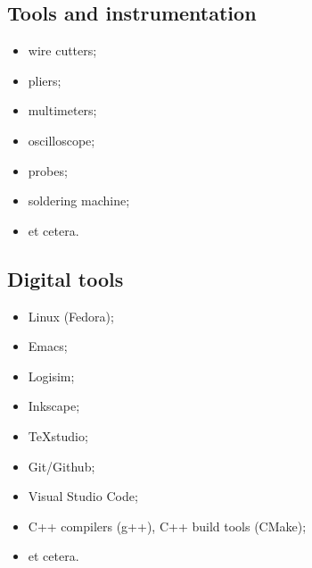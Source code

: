 \subsection{Tools and instrumentation}
\begin{itemize}
	\item wire cutters;
	\item pliers;
	\item multimeters;
	\item oscilloscope;
	\item probes;
	\item soldering machine;
	\item et cetera.
\end{itemize}

\subsection{Digital tools}
\begin{itemize}
	\item Linux (Fedora);
	\item Emacs;
	\item Logisim;
	\item Inkscape;
	\item TeXstudio;
	\item Git/Github;
	\item Visual Studio Code;
	\item C++ compilers (g++), C++ build tools (CMake);
	\item et cetera.
\end{itemize}